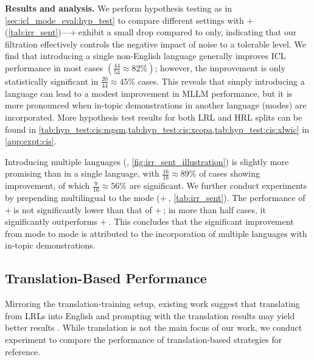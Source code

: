 \vspace{2pt}\noindent\textbf{Results and analysis.}
We perform hypothesis testing as in \cref{sec:icl_mode_eval:hyp_test} to compare different \cis settings with \english$+\ $\cisEn (\cref{tab:irr_sent})---\english$+\ $\cisEn exhibit a small drop compared to \english only, indicating that our filtration effectively controls the negative impact of noise to a tolerable level.
We find that introducing a single non-English language generally improves ICL performance in most cases $\left(\frac{44}{54} \approx 82\%\right)$; however, the improvement is only statistically significant in $\frac{20}{44} \approx 45\%$ cases.
This reveals that simply introducing a language can lead to a modest improvement in MLLM performance, but it is more pronounced when in-topic demonstrations in another language (\monolingual modes) are incorporated.
More hypothesis test results for both LRL and HRL splits can be found in \cref{tab:hyp_test:cis:mgsm,tab:hyp_test:cis:xcopa,tab:hyp_test:cis:xlwic} in \cref{app:expt:cis}.


Introducing multiple languages (\cisMulti, \cref{fig:irr_sent_illustration}) is slightly more promising than \cis in a single language, with $\frac{16}{18}\approx 89\%$ of cases showing improvement, of which $\frac{9}{16}\approx 56\%$ are significant.
We further conduct experiments by prepending multilingual \cis to the \multilingual mode (\multilingual$+\ $\cisMulti, \cref{tab:irr_sent}). The performance of \multilingual$+\ $\cisMulti is not significantly lower than that of \english$+\ $\cisMulti; in more than half cases, it significantly outperforms \english$+\ $\cisMulti. This concludes that the significant improvement from \english mode to \multilingual mode is attributed to the incorporation of multiple languages with in-topic demonstrations.










\subsection{Translation-Based Performance} \label{sec:icl_mode_eval:translation}
Mirroring the translation-training  setup, existing work suggest that translating from LRLs into English and prompting with the translation results may yield better results .
While translation is not the main focus of our work, we conduct experiment to compare the performance of translation-based strategies for reference.

